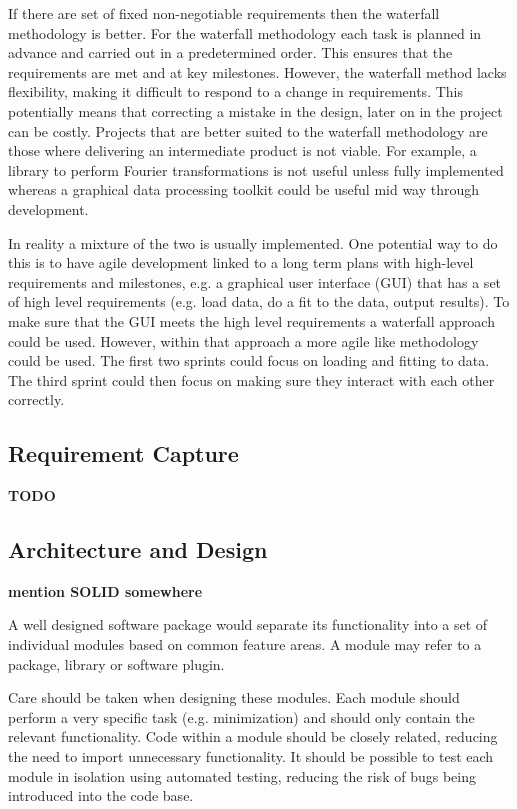 \documentclass[jnr]{iosart2x}
\newcommand{\todo}[1]{\textbf{#1}}
\begin{document}
If there are set of fixed non-negotiable requirements then the waterfall methodology is better.
For the waterfall methodology each task is planned in advance and carried out in a predetermined order.
This ensures that the requirements are met and at key milestones.
However, the waterfall method lacks flexibility, making it difficult to respond to a change in requirements.
This potentially means that correcting a mistake in the design, later on in the project can be costly.
Projects that are better suited to the waterfall methodology are those where delivering an intermediate product is not viable.
For example, a library to perform Fourier transformations is not useful unless fully implemented whereas a graphical data processing toolkit could be useful mid way through development.

In reality a mixture of the two is usually implemented.
One potential way to do this is to have agile development linked to a long term plans with high-level requirements and milestones, e.g. a graphical user interface (GUI) that has a set of high level requirements (e.g. load data, do a fit to the data, output results).
To make sure that the GUI meets the high level requirements a waterfall approach could be used.
However, within that approach a more agile like methodology could be used.
The first two sprints could focus on loading and fitting to data.
The third sprint could then focus on making sure they interact with each other correctly.

\subsection{Requirement Capture}
\label{Requirements}

\todo{TODO}

\subsection{Architecture and Design}
\label{Architecture}

\todo{mention SOLID somewhere}

A well designed software package would separate its functionality into a set of individual modules based on common feature areas.
A module may refer to a package, library or software plugin.

Care should be taken when designing these modules.
Each module should perform a very specific task (e.g. minimization) and should only contain the relevant functionality.
Code within a module should be closely related, reducing the need to import unnecessary functionality.
It should be possible to test each module in isolation using automated testing, reducing the risk of bugs being introduced into the code base.
\end{document}
